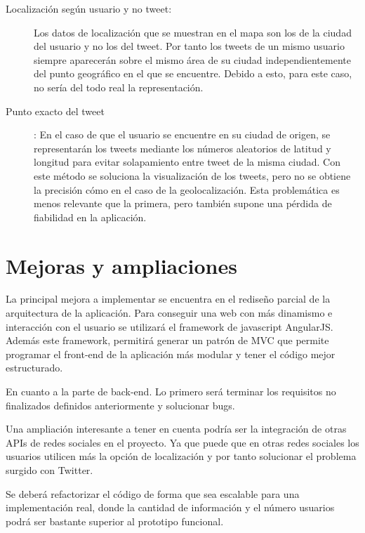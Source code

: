 \begin{description}

\item [Localización según usuario y no tweet:] Los datos de localización que se muestran en el mapa son los de la ciudad del usuario y no los del tweet. Por tanto los tweets de un mismo usuario siempre aparecerán sobre el mismo área de su ciudad independientemente del punto geográfico en el que se encuentre. Debido a esto, para este caso, no sería del todo real la representación.

\item [Punto exacto del tweet]: En el caso de que el usuario se encuentre en su ciudad de origen, se representarán los tweets mediante los números aleatorios de latitud y longitud para evitar solapamiento entre tweet de la misma ciudad. Con este método se soluciona la visualización de los tweets, pero no se obtiene la precisión cómo en el caso de la geolocalización. Esta problemática es menos relevante que la primera, pero también supone una pérdida de fiabilidad en la aplicación.

\end{description}


\section{Mejoras y ampliaciones}

La principal mejora a implementar se encuentra en el rediseño parcial de la arquitectura de la aplicación. Para conseguir una web con más dinamismo e interacción con el usuario se utilizará el framework de javascript AngularJS. Además este framework, permitirá generar un patrón de MVC que permite programar el front-end de la aplicación más modular y tener el código mejor estructurado.

\vspace{5 mm}

En cuanto a la parte de back-end. Lo primero será terminar los requisitos no finalizados definidos anteriormente y solucionar bugs.

Una ampliación interesante a tener en cuenta podría ser la integración de otras APIs de redes sociales en el proyecto. Ya que puede que en otras redes sociales los usuarios utilicen más la opción de localización y por tanto solucionar el problema surgido con Twitter.


Se deberá refactorizar el código de forma que sea escalable para una implementación real, donde la cantidad de información y el número usuarios podrá ser bastante superior al prototipo funcional.


